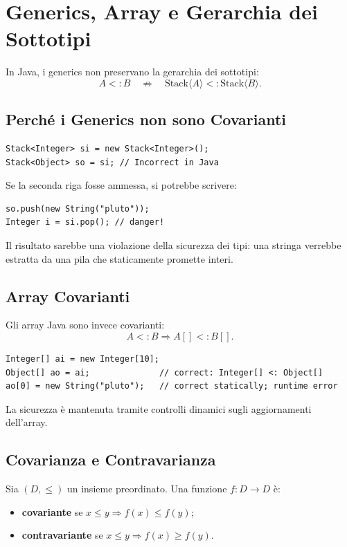 \documentclass{article}
\begin{document}
\section{Generics, Array e Gerarchia dei Sottotipi}

In Java, i generics non preservano la gerarchia dei sottotipi:
\[
A <: B \quad \nRightarrow \quad \mathrm{Stack}\langle A\rangle <: \mathrm{Stack}\langle B\rangle.
\]

\subsection{Perché i Generics non sono Covarianti}

\begin{lstlisting}
Stack<Integer> si = new Stack<Integer>();
Stack<Object> so = si; // Incorrect in Java
\end{lstlisting}

Se la seconda riga fosse ammessa, si potrebbe scrivere:

\begin{lstlisting}
so.push(new String("pluto"));
Integer i = si.pop(); // danger!
\end{lstlisting}

Il risultato sarebbe una violazione della sicurezza dei tipi: una stringa verrebbe estratta da una pila che staticamente promette interi.

\subsection{Array Covarianti}

Gli array Java sono invece covarianti:
\[
A <: B \Rightarrow A[] <: B[].
\]

\begin{lstlisting}
Integer[] ai = new Integer[10];
Object[] ao = ai;              // correct: Integer[] <: Object[]
ao[0] = new String("pluto");   // correct statically; runtime error
\end{lstlisting}

La sicurezza è mantenuta tramite controlli dinamici sugli aggiornamenti dell'array.

\subsection{Covarianza e Contravarianza}

Sia $(D,\leq)$ un insieme preordinato. Una funzione $f : D \to D$ è:
\begin{itemize}
  \item \textbf{covariante} se $x \leq y \Rightarrow f(x) \leq f(y)$;
  \item \textbf{contravariante} se $x \leq y \Rightarrow f(x) \geq f(y)$.
\end{itemize}
\end{document}

